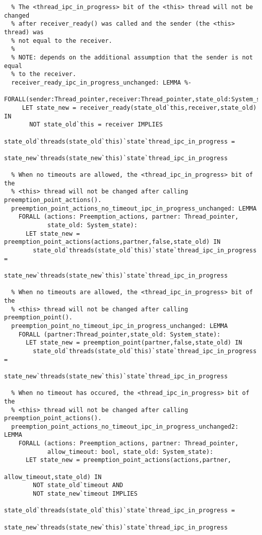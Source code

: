 \begin{lstlisting}
  % The <thread_ipc_in_progress> bit of the <this> thread will not be changed 
  % after receiver_ready() was called and the sender (the <this> thread) was 
  % not equal to the receiver.
  %
  % NOTE: depends on the additional assumption that the sender is not equal
  % to the receiver.
  receiver_ready_ipc_in_progress_unchanged: LEMMA %-
   FORALL(sender:Thread_pointer,receiver:Thread_pointer,state_old:System_state):
     LET state_new = receiver_ready(state_old`this,receiver,state_old) IN
       NOT state_old`this = receiver IMPLIES
         state_old`threads(state_old`this)`state`thread_ipc_in_progress =
           state_new`threads(state_new`this)`state`thread_ipc_in_progress

  % When no timeouts are allowed, the <thread_ipc_in_progress> bit of the
  % <this> thread will not be changed after calling preemption_point_actions().
  preemption_point_actions_no_timeout_ipc_in_progress_unchanged: LEMMA
    FORALL (actions: Preemption_actions, partner: Thread_pointer, 
            state_old: System_state):
      LET state_new = preemption_point_actions(actions,partner,false,state_old) IN
        state_old`threads(state_old`this)`state`thread_ipc_in_progress =
          state_new`threads(state_new`this)`state`thread_ipc_in_progress

  % When no timeouts are allowed, the <thread_ipc_in_progress> bit of the
  % <this> thread will not be changed after calling preemption_point().
  preemption_point_no_timeout_ipc_in_progress_unchanged: LEMMA
    FORALL (partner:Thread_pointer,state_old: System_state):
      LET state_new = preemption_point(partner,false,state_old) IN
        state_old`threads(state_old`this)`state`thread_ipc_in_progress =
          state_new`threads(state_new`this)`state`thread_ipc_in_progress

  % When no timeout has occured, the <thread_ipc_in_progress> bit of the
  % <this> thread will not be changed after calling preemption_point_actions().
  preemption_point_actions_no_timeout_ipc_in_progress_unchanged2: LEMMA
    FORALL (actions: Preemption_actions, partner: Thread_pointer,
            allow_timeout: bool, state_old: System_state):
      LET state_new = preemption_point_actions(actions,partner,
                                               allow_timeout,state_old) IN
        NOT state_old`timeout AND 
        NOT state_new`timeout IMPLIES
          state_old`threads(state_old`this)`state`thread_ipc_in_progress =
            state_new`threads(state_new`this)`state`thread_ipc_in_progress


\end{lstlisting}

